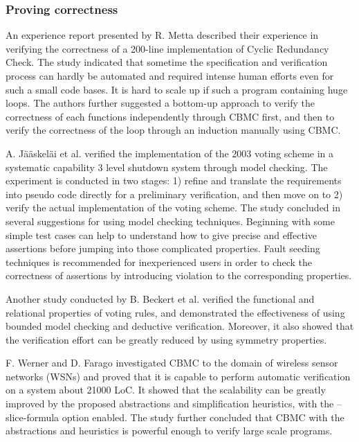 \subsubsection{Proving correctness}
An experience report presented by R. Metta \cite{Metta:2011:VCO:2004685.2005455} described their experience in verifying the correctness of a 200-line implementation of Cyclic Redundancy Check. The study indicated that sometime the specification and verification process can hardly be automated and required intense human efforts even for such a small code bases. It is hard to scale up if such a program containing huge loops. The authors further suggested a bottom-up approach to verify the correctness of each functions independently through CBMC first, and then to verify the correctness of the loop through an induction manually using CBMC. 

A. J{\"a}{\"a}skel{\"a}i et al. \cite{jskelinen_et_al:OASIcs:2012:3589} verified the implementation of the 2003 voting scheme in a systematic capability 3 level shutdown system through model checking. The experiment is conducted in two stages: 1) refine and translate the requirements into pseudo code directly for a preliminary verification, and then move on to 2) verify the actual implementation of the voting scheme. The study concluded in several suggestions for using model checking techniques. Beginning with some simple test cases can help to understand how to give precise and effective assertions before jumping into those complicated properties. Fault seeding techniques is recommended for inexperienced users in order to check the correctness of assertions by introducing violation to the corresponding properties. 

Another study conducted by B. Beckert et al. \cite{beckertBormerKirsten2016} verified the functional and relational properties of voting rules, and demonstrated the effectiveness of using bounded model checking and deductive verification. Moreover, it also showed that the verification effort can be greatly reduced by using symmetry properties. 

F. Werner and D. Farago \cite{Werner2010CorrectnessOS} investigated CBMC to the domain of wireless sensor networks (WSNs) and proved that it is capable to perform automatic verification on a system about 21000 LoC. It showed that the scalability can be greatly improved by the proposed abstractions and simplification heuristics, with the --slice-formula option enabled. The study further concluded that CBMC with the abstractions and heuristics is powerful enough to verify large scale programs. 

